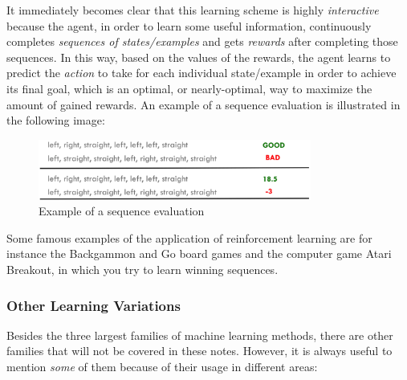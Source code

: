 \vspace{5mm}

\newpage

It immediately becomes clear that this learning scheme is highly
\emph{interactive} because the agent, in order to learn some useful
information, continuously completes \emph{sequences of states/examples}
and gets \emph{rewards} after completing those sequences. In this way,
based on the values of the rewards, the agent learns to predict the
\emph{action} to take for each individual state/example in order to
achieve its final goal, which is an optimal, or nearly-optimal, way to
maximize the amount of gained rewards. An example of a sequence evaluation
is illustrated in the following image:

\vspace{5mm}

\begin{figure}[h]
      \centering
      \includegraphics[width=0.8\textwidth]{../img/Sequence_example}
      \caption{Example of a sequence evaluation}
\end{figure}

\vspace{5mm}

Some famous examples of the application of reinforcement learning are
for instance the Backgammon and Go board games and the computer game
Atari Breakout, in which you try to learn winning sequences.

\subsubsection{Other Learning Variations}

Besides the three largest families of machine learning methods,
there are other families that will not be covered in these notes.
However, it is always useful to mention \emph{some} of them because
of their usage in different areas:

